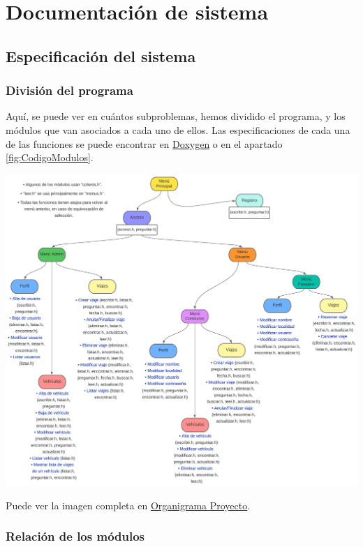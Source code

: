 

\section{Documentación de sistema}

\subsection{Especificación del sistema}

\subsubsection{División del programa}

Aquí, se puede ver en cuántos subproblemas, hemos dividido el programa, y los módulos que van asociados a cada uno de ellos.
Las especificaciones de cada una de las funciones se puede encontrar en \href{DOC_DOXYGEN/index.html}{Doxygen} o en el apartado \ref{fig:CodigoModulos}.

\begin{center}
  \includegraphics[width=1.15\textwidth]{FOTOS/Organigrama_Proyecto.jpeg}
\end{center}

Puede ver la imagen completa en \href{FOTOS/Organigrama_Proyecto.jpeg}{Organigrama Proyecto}.

\subsubsection{Relación de los módulos}

